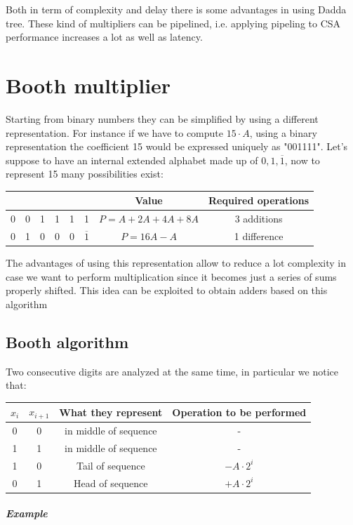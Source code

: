 Both in term of complexity and delay there is some advantages in using Dadda tree. These kind of multipliers can be pipelined, i.e. applying pipeling to CSA performance increases a lot as well as latency.

\section{Booth multiplier}

Starting from binary numbers they can be simplified by using a different representation. For instance if we have to compute  $15 \cdot A$, using a binary representation the coefficient 15 would be expressed uniquely as "001111". Let's suppose to have an internal extended alphabet made up of ${0,1,\overline{1}}$, now to represent 15 many possibilities exist:

\begin{center}
  \begin{tabular}{|c|c|c|c|c|c|c|c|}
    \hline
     & & & & & & Value & Required operations\\
    \hline
    0&  0&  1&  1&  1&  1&        $P=A+2A+4A+8A$&   3 additions\\
    0&  1&  0&  0&  0&  $\overline{1}$& $P=16A-A$&      1 difference\\
    \hline
  \end{tabular}
\end{center}

The advantages of using this representation allow to reduce a lot complexity in case we want to perform multiplication since it becomes just a series of sums properly shifted. This idea can be exploited to obtain adders based on this algorithm

\subsection{Booth algorithm}
Two consecutive digits are analyzed at the same time, in particular we notice that:
\begin{center}
\begin{tabular}{|c|c|c|c|}
  \hline
  $x_i$&  $x_{i+1}$&  What they represent&  Operation to be performed\\
  \hline
  0&    0&      in middle of sequence&  -\\
  1&    1&      in middle of sequence&  -\\
  1&    0&      Tail of sequence&   $-A \cdot 2^i$\\
  0&    1&      Head of sequence&   $+A \cdot 2^i$\\
  \hline
\end{tabular}
\end{center}
\subparagraph{Example}


